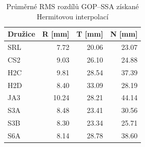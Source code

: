 \begin{table}[H]
\centering
\small
\caption{Průměrné RMS rozdílů GOP--SSA získané Hermitovou interpolací}
\label{tab:gop_vs_ssa_satellites_doy001-doy030_hermite_rms}
\begin{tabular}{lrrr}
\toprule
Družice & R [mm] & T [mm] & N [mm] \\
\midrule
SRL & 7.72 & 20.06 & 23.07 \\
CS2 & 9.03 & 26.10 & 24.88 \\
H2C & 9.81 & 28.54 & 37.39 \\
H2D & 8.40 & 33.09 & 28.19 \\
JA3 & 10.24 & 28.21 & 44.14 \\
S3A & 8.48 & 23.41 & 30.56 \\
S3B & 8.30 & 23.34 & 25.71 \\
S6A & 8.14 & 28.78 & 38.60 \\
\bottomrule
\end{tabular}
\end{table}
